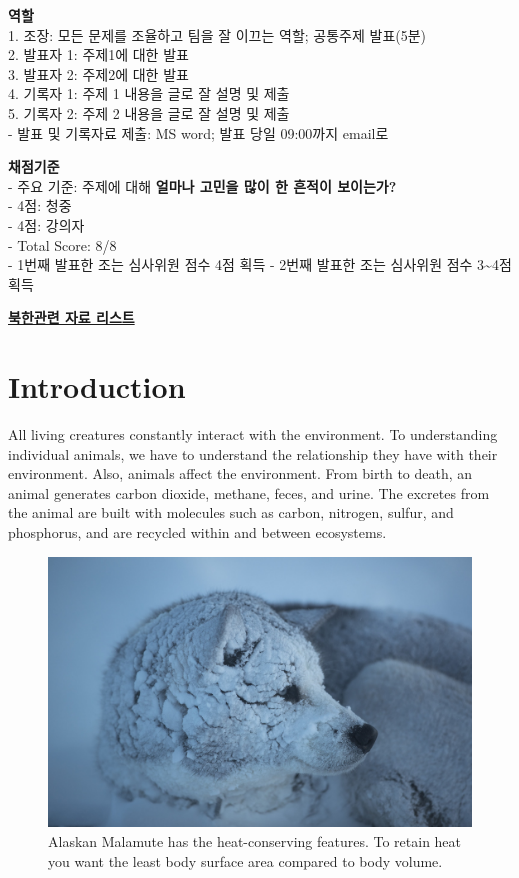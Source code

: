 \documentclass[]{book}
\begin{document}
\textbf{역할}\\
1. 조장: 모든 문제를 조율하고 팀을 잘 이끄는 역할; 공통주제 발표(5분)\\
2. 발표자 1: 주제1에 대한 발표\\
3. 발표자 2: 주제2에 대한 발표\\
4. 기록자 1: 주제 1 내용을 글로 잘 설명 및 제출\\
5. 기록자 2: 주제 2 내용을 글로 잘 설명 및 제출\\
- 발표 및 기록자료 제출: MS word; 발표 당일 09:00까지 email로

\textbf{채점기준}\\
- 주요 기준: 주제에 대해 \textbf{얼마나 고민을 많이 한 흔적이
보이는가?}\\
- 4점: 청중\\
- 4점: 강의자\\
- Total Score: 8/8\\
- 1번째 발표한 조는 심사위원 점수 4점 획득 - 2번째 발표한 조는 심사위원
점수 3\textasciitilde{}4점 획득

\textbf{\href{https://github.com/YoungjunNa/aes/blob/master/NK.pdf}{북한관련
자료 리스트}}

\chapter{Introduction}\label{intro}

All living creatures constantly interact with the environment. To
understanding individual animals, we have to understand the relationship
they have with their environment. Also, animals affect the environment.
From birth to death, an animal generates carbon dioxide, methane, feces,
and urine. The excretes from the animal are built with molecules such as
carbon, nitrogen, sulfur, and phosphorus, and are recycled within and
between ecosystems.

\begin{figure}

{\centering \includegraphics[width=1\linewidth]{figures/polar} 

}

\caption{Alaskan Malamute has the heat-conserving features. To retain heat you want the least body surface area compared to body volume.}\label{fig:snow-dog}
\end{figure}
\end{document}
